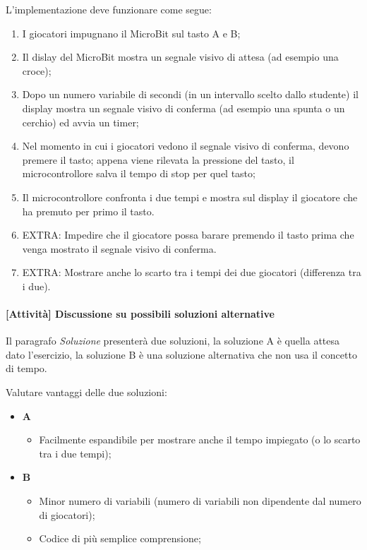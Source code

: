 \documentclass[../../docenti.tex]{subfiles}
\begin{document}
L'implementazione deve funzionare come segue:
\begin{enumerate}
	\item I giocatori impugnano il MicroBit sul tasto A e B;
	\item Il dislay del MicroBit mostra un segnale visivo di attesa (ad esempio una croce);
	\item Dopo un numero variabile di secondi (in un intervallo scelto dallo studente) il display mostra un segnale visivo di conferma (ad esempio una spunta o un cerchio) ed avvia un timer;
	\item Nel momento in cui i giocatori vedono il segnale visivo di conferma, devono premere il tasto; appena viene rilevata la pressione del tasto, il microcontrollore salva il tempo di stop per quel tasto;
	\item Il microcontrollore confronta i due tempi e mostra sul display il giocatore che ha premuto per primo il tasto.
	\item EXTRA: Impedire che il giocatore possa barare premendo il tasto prima che venga mostrato il segnale visivo di conferma.
	\item EXTRA: Mostrare anche lo scarto tra i tempi dei due giocatori (differenza tra i due).
\end{enumerate}

\paragraph{[Attività] Discussione su possibili soluzioni alternative}
Il paragrafo \textit{Soluzione} presenterà due soluzioni, la soluzione A è quella attesa dato l'esercizio, la soluzione B è una soluzione alternativa che non usa il concetto di tempo.


Valutare vantaggi delle due soluzioni:
\begin{itemize}
	\item \textbf{A}
	\begin{itemize}
		\item Facilmente espandibile per mostrare anche il tempo impiegato (o lo scarto tra i due tempi);
	\end{itemize}
	\item \textbf{B}
	\begin{itemize}
		\item Minor numero di variabili (numero di variabili non dipendente dal numero di giocatori);
		\item Codice di più semplice comprensione;
	\end{itemize}
\end{itemize}
\end{document}
